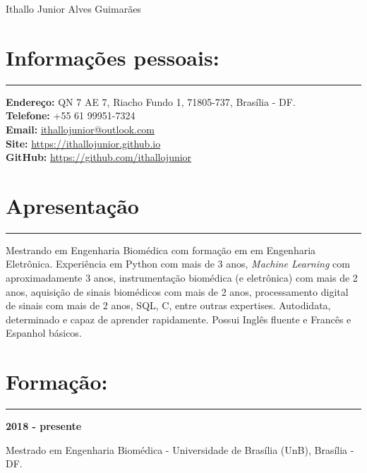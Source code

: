 \documentclass[11pt]{article}
\begin{document}
\begin{center}
\huge{Ithallo Junior Alves Guimarães}
\end{center}

\section{Informações pessoais:}
\hrule \vspace{0.1cm}
\begin{addmargin}{0.5cm}

\textbf{Endereço:}  QN 7 AE 7, Riacho Fundo 1, 71805-737, Brasília - DF. \\
\textbf{Telefone:}  +55 61 99951-7324 \\
\textbf{Email:}   \href{maito:ithallojunior@outlook.com}{ithallojunior@outlook.com} \\
\textbf{Site:}  \url{https://ithallojunior.github.io}  \\
\textbf{GitHub:} \url{https://github.com/ithallojunior}

\end{addmargin}

\section{Apresentação}
\hrule \vspace{0.1cm}

\begin{addmargin}{0.5cm}

Mestrando em Engenharia Biomédica com formação em em Engenharia Eletrônica. 
Experiência em Python com mais de 3 anos, 
\textit{Machine Learning} com aproximadamente 3 anos, instrumentação biomédica (e 
eletrônica) com mais de 2 anos, 
aquisição de sinais biomédicos com mais de 2 anos, processamento digital de sinais
com mais de 2 anos, SQL, C,  entre outras expertises. Autodidata, determinado e 
capaz de aprender rapidamente. Possui Inglês fluente e Francês e Espanhol básicos.

\end{addmargin}

\section{Formação:}
\hrule \vspace{0.1cm}

\textbf{2018 - presente}
\begin{addmargin}{0.5cm}
Mestrado em Engenharia Biomédica - Universidade de Brasília (UnB), Brasília - DF. \\
\end{addmargin}
\end{document}
